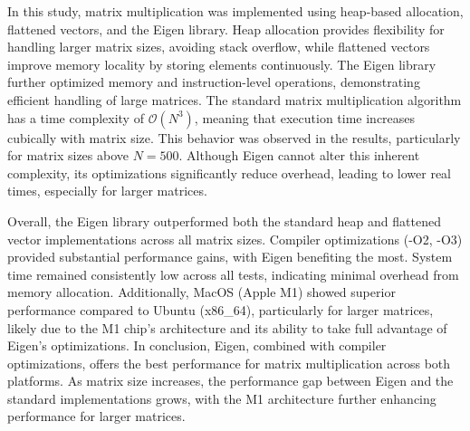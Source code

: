 \documentclass{article}
\begin{document}
In this study, matrix multiplication was implemented using heap-based allocation, flattened vectors, and the Eigen library. Heap allocation provides flexibility for handling larger matrix sizes, avoiding stack overflow, while flattened vectors improve memory locality by storing elements continuously. The Eigen library further optimized memory and instruction-level operations, demonstrating efficient handling of large matrices. The standard matrix multiplication algorithm has a time complexity of \(\mathcal{O}(N^3)\), meaning that execution time increases cubically with matrix size. This behavior was observed in the results, particularly for matrix sizes above \(N = 500\). Although Eigen cannot alter this inherent complexity, its optimizations significantly reduce overhead, leading to lower real times, especially for larger matrices.

\vspace{0.12cm}
Overall, the Eigen library outperformed both the standard heap and flattened vector implementations across all matrix sizes. Compiler optimizations (-O2, -O3) provided substantial performance gains, with Eigen benefiting the most. System time remained consistently low across all tests, indicating minimal overhead from memory allocation. Additionally, MacOS (Apple M1) showed superior performance compared to Ubuntu (x86\_64), particularly for larger matrices, likely due to the M1 chip's architecture and its ability to take full advantage of Eigen’s optimizations. In conclusion, Eigen, combined with compiler optimizations, offers the best performance for matrix multiplication across both platforms. As matrix size increases, the performance gap between Eigen and the standard implementations grows, with the M1 architecture further enhancing performance for larger matrices.
\end{document}
